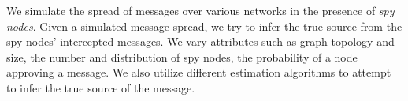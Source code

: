 We simulate the spread of messages over various networks in the presence of \emph{spy nodes}. Given a simulated message spread, we try to infer the true source from the spy nodes’ intercepted messages.  We vary attributes such as graph topology and size, the number and distribution of spy nodes, the probability of a node approving a message. We also utilize different estimation algorithms to attempt to infer the true source of the message. 

